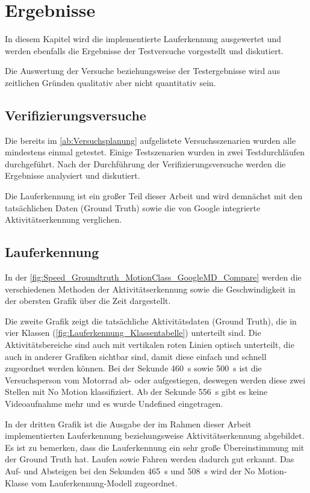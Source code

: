 \chapter{Ergebnisse}

In diesem Kapitel wird die implementierte Lauferkennung ausgewertet und werden ebenfalls die Ergebnisse der Testversuche vorgestellt und diskutiert.

Die Auswertung der Versuche beziehungsweise der Testergebnisse wird aus zeitlichen Gründen qualitativ aber nicht quantitativ sein.


\section{Verifizierungsversuche}

Die bereits im \autoref{ab:Versuchsplanung} aufgelistete Versuchsszenarien wurden alle mindestens einmal getestet. Einige Testszenarien wurden in zwei Testdurchläufen durchgeführt.
Nach der Durchführung der Verifizierungsversuche werden die Ergebnisse analysiert und diskutiert. 

Die Lauferkennung ist ein großer Teil dieser Arbeit und wird demnächst mit den tatsächlichen Daten (Ground Truth) sowie die von Google integrierte Aktivitäts\-erkennung verglichen.
\section{Lauferkennung}

In der \autoref{fig:Speed_Groundtruth_MotionClass_GoogleMD_Compare} werden die verschiedenen Methoden der Aktivitätserkennung sowie die Geschwindigkeit in der obersten Grafik über die Zeit dargestellt.

Die zweite Grafik zeigt die tatsächliche Aktivitätsdaten (Ground Truth), die in vier Klassen (\autoref{fig:Lauferkennung_Klassentabelle}) unterteilt sind. Die Aktivitätsbereiche sind auch mit vertikalen roten Linien optisch unterteilt, die auch in anderer Grafiken sichtbar sind, damit diese einfach und schnell zugeordnet werden können. Bei der Sekunde \SI{460}{\second} sowie \SI{500}{\second} ist die Versuchsperson vom Motorrad ab- oder aufgestiegen, deswegen werden diese zwei Stellen mit \glqq No Motion\grqq{} klassifiziert. Ab der Sekunde \SI{556}{\second} gibt es keine Videoaufnahme mehr und es wurde \glqq Undefined\grqq{} eingetragen.

In der dritten Grafik ist die Ausgabe der im Rahmen dieser Arbeit implementierten Lauferkennung beziehungsweise Aktivitätserkennung abgebildet. 
Es ist zu bemerken, dass die Lauferkennung ein sehr große Übereinstimmung mit der Ground Truth hat. Laufen sowie Fahren werden dadurch gut erkannt. Das Auf- und Absteigen bei den Sekunden \SI{465}{\second} und \SI{508}{\second} wird der \glqq No Motion\grqq{}-Klasse vom Lauferkennung-Modell zugeordnet.

